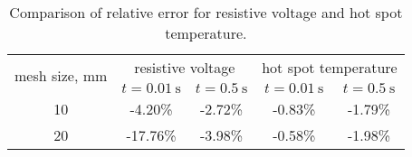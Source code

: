  \begin{table}[H]
    \caption{Comparison of relative error for resistive voltage and hot spot temperature.} 
    \vspace{-1.em} 
    \fontsize{10}{10}
    \selectfont 
    \renewcommand{\arraystretch}{1.5}
    \begin{center}
        \begin{tabular}{ c | cc | cc }  
        \hline
        \multirow{2}{*}{mesh size, mm} & \multicolumn{2}{c|}{resistive voltage} & \multicolumn{2}{c}{hot spot temperature} \\ 
           & $t=0.01~\text{s}$ & $t=0.5~\text{s}$ & $t=0.01~\text{s}$ & $t=0.5~\text{s}$ \\
        \hline
        10 & -4.20\% & -2.72\% & -0.83\% & -1.79\% \\
        20 & -17.76\% & -3.98\% & -0.58\% & -1.98\% \\
        \hline 
        \end{tabular}
    \end{center}  
     \label{table: 1d_qv_benchmarking_with_insulation_res_and_hot_spot_error_conclusion} 
 \end{table}